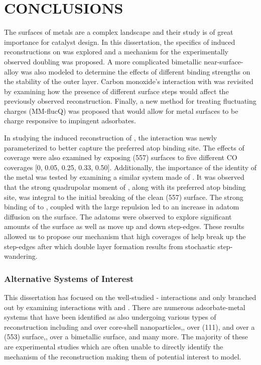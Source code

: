\chapter{CONCLUSIONS}


The surfaces of metals are a complex landscape and their study is of great
importance for catalyst design. In this dissertation, the specifics of 
induced reconstructions on  was explored and a mechanism for the
experimentally observed doubling was proposed. A more complicated bimetallic
 near-surface-alloy was also modeled to determine the effects
of different binding strengths on the stability of the outer  layer.
Carbon monoxide's interaction with  was revisited by examining how the
presence of different surface steps would affect the previously observed
reconstruction. Finally, a new method for treating fluctuating charges
(MM-flucQ) was proposed that would allow for metal surfaces to be charge
responsive to impingent adsorbates.

In studying the induced reconstruction of , the 
interaction was newly parameterized to better capture the preferred atop
binding site. The effects of coverage were also examined by exposing (557)
 surfaces to five different CO coverages [0, 0.05, 0.25, 0.33, 0.50].
Additionally, the importance of the identity of the metal was tested by
examining a similar system made of . It was observed that the strong
quadrupolar moment of , along with its preferred atop binding site, was
integral to the initial breaking of the clean (557) surface. The strong binding
of  to , coupled with the large  repulsion led
to an increase in  adatom diffusion on the surface. The adatoms were
observed to explore significant amounts of the surface as well as move up and
down step-edges. These results allowed us to propose our mechanism that high
coverages of  help break up the step-edges after which double layer
formation results from stochastic step-wandering.




\subsection{Alternative Systems of Interest}
This dissertation has focused on the well-studied - interactions
and only branched out by examining  interactions with  and
.  There are numerous adsorbate-metal systems that have been identified
as also undergoing various types of reconstruction including  and
 over  core-shell nanoparticles,\citep{Tao:2008aa},
 over  (111),\citep{Eren:2016qt}  and  over a (553)
 surface,\citep{Zhang:2015zr},  over a  bimetallic
surface,\citep{Kim:2013mi} and many more. The majority of these are experimental
studies which are often unable to directly identify the mechanism of the
reconstruction making them of potential interest to model.

